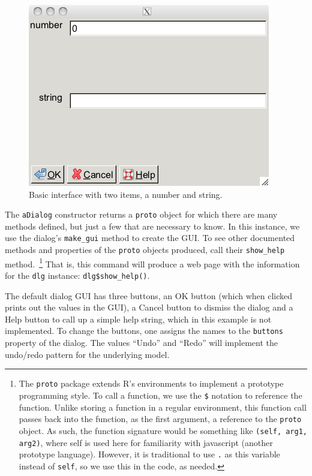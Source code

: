 \documentclass{article}
\newcommand{\code}[1]{\texttt{#1}} %
\newcommand{\function}[1]{\code{#1}} %
\newcommand{\constructor}[1]{\function{#1}\index{#1}}
\newcommand{\generic}[1]{\code{#1}} %
\newcommand{\meth}[1]{\generic{#1}}     %
\newcommand{\property}[1]{\code{#1}}     %
\newcommand{\object}[1]{\code{#1}}
\newcommand{\pkg}[1]{\texttt{#1}}
\begin{document}
\begin{figure}
  \centering
  \includegraphics[width=.6\textwidth]{basic-gui}
  \caption{Basic  interface with two items, a number and string.}
  \label{fig:basic-gui}
\end{figure}

The \constructor{aDialog} constructor returns a \pkg{proto} object for
which there are many methods defined, but just a few that are
necessary to know. In this instance, we use the dialog's
\meth{make\_gui} method to create the GUI. To see other documented
methods and properties of the \pkg{proto} objects produced, call their
\meth{show\_help} method.~\footnote{The \pkg{proto} package extends
  R's environments to implement a prototype programming style. To call
  a function, we use the \code{\$} notation to reference the
  function. Unlike storing a function in a regular environment, this
  function call passes back into the function, as the first argument,
  a reference to the \pkg{proto} object. As such, the function
  signature would be something like \code{(self, arg1, arg2)}, where
  self is used here for familiarity with javascript (another prototype
  language). However, it is traditional to use \object{.} as this
  variable instead of \object{self}, so we use this in the code, as
  needed.} That is, this command will produce a web page with the
information for the \code{dlg} instance: \code{dlg\$show\_help()}.

The default dialog GUI has three buttons, an OK button (which when clicked
prints out the values in the GUI), a Cancel button to dismiss the
dialog and a Help button to call up a simple help string, which in
this example is not implemented. To change the buttons, one assigns
the names to the \property{buttons} property of the dialog. The values
``Undo'' and ``Redo'' will implement the undo/redo pattern for the
underlying model.
\end{document}
